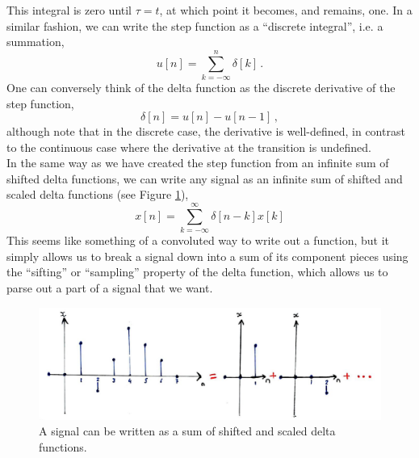 %
This integral is zero until $\tau = t$, at which point it becomes, and remains, one. In a similar
fashion, we can write the step function as a ``discrete integral'', i.e. a summation,
%
\begin{equation}
  u[n] = \sum_{k=-\infty}^n \delta[k] \,.
\end{equation}
%
One can conversely think of the delta function as the discrete derivative of the step function,
%
\begin{equation}
  \delta[n] = u[n] - u[n-1] \,,
\end{equation}
%
although note that in the discrete case, the derivative is well-defined, in contrast to the continuous
case where the derivative at the transition is undefined.\\
%
In the same way as we have created the step function from an infinite sum of shifted delta functions,
we can write any signal as an infinite sum of shifted and scaled delta functions (see Figure
\ref{fig::lecture_1_sum_of_deltas}),
%
\begin{equation}
  x[n] = \sum_{k=-\infty}^\infty \delta[n-k] x[k]
\end{equation}
%
This seems like something of a convoluted way to write out a function, but it simply allows us to
break a signal down into a sum of its component pieces using the ``sifting'' or ``sampling'' property
of the delta function, which allows us to parse out a part of a signal that we want.
%
\begin{figure}[!htb]
  \includegraphics[width=\textwidth]{images/lecture_1_sum_of_deltas.JPG}
  \caption{
    A signal can be written as a sum of shifted and scaled delta functions.
  }
  \label{fig::lecture_1_sum_of_deltas}
\end{figure}

